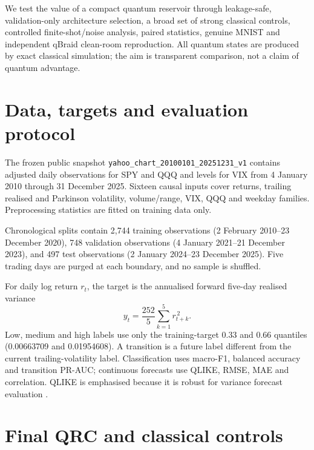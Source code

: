 \documentclass[11pt,a4paper]{article}
\begin{document}
We test the value of a compact quantum reservoir through leakage-safe,
validation-only architecture selection, a broad set of strong classical
controls, controlled finite-shot/noise analysis, paired statistics, genuine
MNIST and independent qBraid clean-room reproduction. All quantum states are
produced by exact classical simulation; the aim is transparent comparison, not
a claim of quantum advantage.

\section{Data, targets and evaluation protocol}

The frozen public snapshot \texttt{yahoo\_chart\_20100101\_20251231\_v1}
contains adjusted daily observations for SPY and QQQ and levels for VIX from
4 January 2010 through 31 December 2025. Sixteen causal inputs cover returns,
trailing realised and Parkinson volatility, volume/range, VIX, QQQ and weekday
families. Preprocessing statistics are fitted on training data only.

Chronological splits contain 2,744 training observations
(2 February 2010--23 December 2020), 748 validation observations
(4 January 2021--21 December 2023), and 497 test observations
(2 January 2024--23 December 2025). Five trading days are purged at each
boundary, and no sample is shuffled.

For daily log return \(r_t\), the target is the annualised forward five-day
realised variance
\[
 y_t=\frac{252}{5}\sum_{k=1}^{5} r_{t+k}^{\,2}.
\]
Low, medium and high labels use only the training-target 0.33 and 0.66
quantiles (0.00663709 and 0.01954608). A transition is a future label different
from the current trailing-volatility label. Classification uses macro-F1,
balanced accuracy and transition PR-AUC; continuous forecasts use QLIKE, RMSE,
MAE and correlation. QLIKE is emphasised because it is robust for variance
forecast evaluation \cite{patton2011volatility}.

\section{Final QRC and classical controls}
\end{document}
